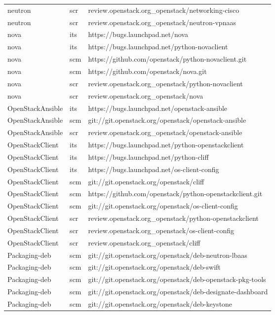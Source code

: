 \begin{center}
\begin{longtable}{|p{4cm}|p{1cm}|p{10cm}|}
neutron&scr&review.openstack.org\_openstack/networking-cisco\\ 
neutron&scr&review.openstack.org\_openstack/neutron-vpnaas\\ 
nova&its&https://bugs.launchpad.net/nova\\ 
nova&its&https://bugs.launchpad.net/python-novaclient\\ 
nova&scm&https://github.com/openstack/python-novaclient.git\\ 
nova&scm&https://github.com/openstack/nova.git\\ 
nova&scr&review.openstack.org\_openstack/python-novaclient\\ 
nova&scr&review.openstack.org\_openstack/nova\\ 
OpenStackAnsible&its&https://bugs.launchpad.net/openstack-ansible\\ 
OpenStackAnsible&scm&git://git.openstack.org/openstack/openstack-ansible\\ 
OpenStackAnsible&scr&review.openstack.org\_openstack/openstack-ansible\\ 
OpenStackClient&its&https://bugs.launchpad.net/python-openstackclient\\ 
OpenStackClient&its&https://bugs.launchpad.net/python-cliff\\ 
OpenStackClient&its&https://bugs.launchpad.net/os-client-config\\ 
OpenStackClient&scm&git://git.openstack.org/openstack/cliff\\ 
OpenStackClient&scm&https://github.com/openstack/python-openstackclient.git\\ 
OpenStackClient&scm&git://git.openstack.org/openstack/os-client-config\\ 
OpenStackClient&scr&review.openstack.org\_openstack/python-openstackclient\\ 
OpenStackClient&scr&review.openstack.org\_openstack/os-client-config\\ 
OpenStackClient&scr&review.openstack.org\_openstack/cliff\\ 
Packaging-deb&scm&git://git.openstack.org/openstack/deb-neutron-lbaas\\ 
Packaging-deb&scm&git://git.openstack.org/openstack/deb-swift\\ 
Packaging-deb&scm&git://git.openstack.org/openstack/deb-openstack-pkg-tools\\ 
Packaging-deb&scm&git://git.openstack.org/openstack/deb-designate-dashboard\\ 
Packaging-deb&scm&git://git.openstack.org/openstack/deb-keystone\\ 

\end{longtable}
\end{center}
